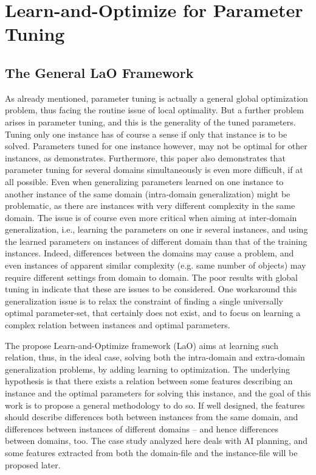 \documentclass[letterpaper]{article}
\begin{document}
\section{Learn-and-Optimize for Parameter Tuning}
\label{section:LaO}

\subsection{The General LaO Framework}

As already mentioned, parameter tuning is actually a general global optimization problem, thus facing the routine issue of local optimality. But a further problem arises in parameter tuning, and this is the generality of the tuned parameters. Tuning only one instance has of course a sense if only that instance is to be solved. Parameters tuned for one instance however, may not be optimal for other instances, as \cite{BibGECCO:2010} demonstrates. Furthermore, this paper also demonstrates that parameter tuning for several domains simultaneously is even more difficult, if at all possible. Even when generalizing parameters learned on one instance to another instance of the same domain (intra-domain generalization) might be problematic, as there are instances with very different complexity in the same domain. The issue is of course even more critical when aiming at inter-domain generalization, i.e., learning the parameters on one ir several instances, and using the learned parameters on instances of different domain than that of the training instances. Indeed, differences between the domains may cause a problem, and even instances of apparent similar complexity (e.g. same number of objects) may require different settings from domain to domain. The poor results with global tuning in \cite{BibGECCO:2010} indicate that these are issues to be considered. One workaround this generalization issue is to relax the constraint of finding a single universally optimal parameter-set, that certainly does not exist, and to focus on learning a complex relation between instances and optimal parameters. 

The propose Learn-and-Optimize framework (LaO) aims at learning such relation, thus, in the ideal case, solving both the intra-domain and extra-domain generalization problems, by adding learning to optimization. The underlying hypothesis is that there exists a relation between some features describing an instance and the optimal parameters for solving this instance, and the goal of this work is to propose a general methodology to do so. If well designed, the features should describe differences both between instances from the same domain, and differences between instances of different domains -- and hence differences between domains, too. 
The case study analyzed here deals with AI planning, and some features extracted from both the domain-file and the instance-file will be proposed later.
\end{document}
